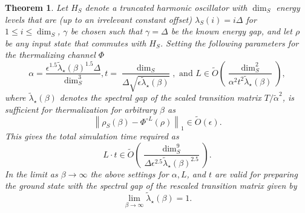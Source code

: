 \documentclass[
 amsmath,amssymb,
 aps,
onecolumn, 
nofootinbib]{revtex4-2}
\newtheorem{theorem}{Theorem}
\newcommand{\norm}[1]{\left\| #1 \right\|}
\newcommand{\bigotilde}[1]{\widetilde{O} \left( #1 \right)}
\begin{document}
\begin{theorem}\label{thm:harmonic_oscillator}
    Let $H_S$ denote a truncated harmonic oscillator with $\dim_S$ energy levels that are (up to an irrelevant constant offset) $\lambda_S(i) = i \Delta$ for $1 \le i \le \dim_S$, $\gamma$ be chosen such that $\gamma = \Delta$ be the known energy gap, and let $\rho$ be any input state that commutes with $H_S$. Setting the following parameters for the thermalizing channel $\Phi$
    \begin{equation}
        \alpha = \frac{\epsilon^{1.5} \widetilde{\lambda}_\star(\beta)^{1.5} \Delta}{\dim_S^3}, t = \frac{\dim_S}{\Delta \sqrt{\epsilon \widetilde{\lambda}_\star(\beta)}}, \text{ and } L \in \bigotilde{\frac{\dim_S^2}{\alpha^2 t^2 \widetilde{\lambda}_\star(\beta)}},
    \end{equation}
    where $\widetilde{\lambda}_\star(\beta)$ denotes the spectral gap of the scaled transition matrix $T / \widetilde{\alpha}^2$, is sufficient for thermalization for arbitrary $\beta$ as
    \begin{equation}
        \norm{\rho_S(\beta) - \Phi^{\circ L}(\rho)}_1 \in \bigotilde{\epsilon}.
    \end{equation}
    This gives the total simulation time required as
    \begin{equation}
        L \cdot t \in \bigotilde{\frac{\dim_S^9}{\Delta \epsilon^{2.5} \widetilde{\lambda}_\star(\beta)^{2.5}}}.
    \end{equation}
    In the limit as $\beta \to \infty$ the above settings for $\alpha, L$, and $t$ are valid for preparing the ground state with the spectral gap of the rescaled transition matrix given by
    \begin{equation}
        \lim_{\beta \to \infty} \widetilde{\lambda}_\star(\beta) = 1.
    \end{equation}

    
\end{theorem}
\end{document}
